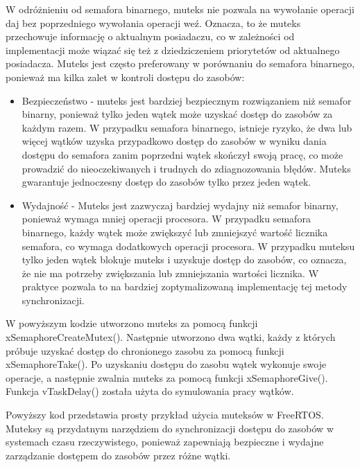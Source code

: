 W odróżnieniu od semafora binarnego, muteks nie pozwala na wywołanie operacji daj bez poprzedniego wywołania operacji weź.
Oznacza, to że muteks przechowuje informację o aktualnym posiadaczu, co w zależności od implementacji może wiązać się też z
dziedziczeniem priorytetów od aktualnego posiadacza. Muteks jest często preferowany w porównaniu do semafora binarnego,
ponieważ ma kilka zalet w kontroli dostępu do zasobów:
\begin{itemize}
    \item Bezpieczeństwo - muteks jest bardziej bezpiecznym rozwiązaniem niż semafor binarny, ponieważ tylko jeden wątek
          może uzyskać dostęp do zasobów za każdym razem. W przypadku semafora binarnego, istnieje ryzyko, że dwa lub więcej
          wątków uzyska przypadkowo dostęp do zasobów w wyniku dania dostępu do semafora zanim poprzedni wątek skończył swoją pracę,
          co może prowadzić do nieoczekiwanych i trudnych do zdiagnozowania błędów. Muteks gwarantuje jednoczesny dostęp do zasobów tylko przez jeden wątek.
    \item Wydajność - Muteks jest zazwyczaj bardziej wydajny niż semafor binarny, ponieważ wymaga mniej operacji procesora.
          W przypadku semafora binarnego, każdy wątek może zwiększyć lub zmniejszyć wartość licznika semafora, co wymaga dodatkowych operacji procesora.
          W przypadku muteksu tylko jeden wątek blokuje muteks i uzyskuje dostęp do zasobów, co oznacza, że nie ma potrzeby zwiększania lub
          zmniejszania wartości licznika. W praktyce pozwala to na bardziej zoptymalizowaną implementację tej metody synchronizacji.
\end{itemize}



W powyższym kodzie utworzono muteks za pomocą funkcji xSemaphoreCreateMutex(). Następnie utworzono dwa wątki, każdy z których próbuje uzyskać
dostęp do chronionego zasobu za pomocą funkcji xSemaphoreTake(). Po uzyskaniu dostępu do zasobu wątek wykonuje swoje operacje,
a następnie zwalnia muteks za pomocą funkcji xSemaphoreGive(). Funkcja vTaskDelay() została użyta do symulowania pracy wątków.

Powyższy kod przedstawia prosty przykład użycia muteksów w FreeRTOS. Muteksy są przydatnym narzędziem do synchronizacji dostępu do zasobów w systemach
czasu rzeczywistego, ponieważ zapewniają bezpieczne i wydajne zarządzanie dostępem do zasobów przez różne wątki.

